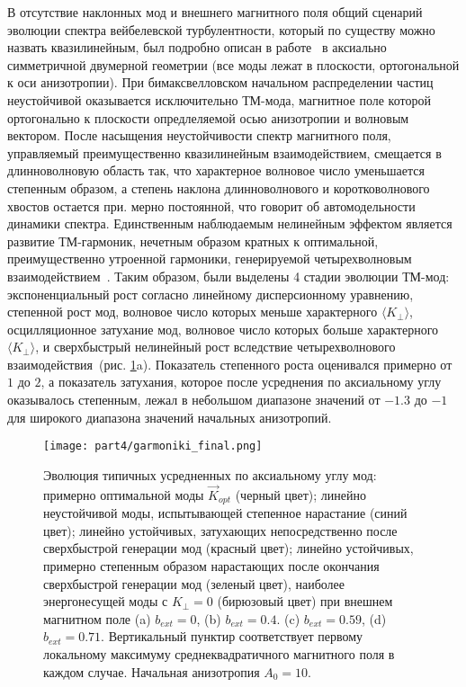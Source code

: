 В отсутствие наклонных мод и внешнего магнитного поля общий сценарий эволюции спектра вейбелевской турбулентности, который по существу можно назвать квазилинейным, был подробно описан в работе~\cite{Kuznetsov2023} в аксиально симметричной двумерной геометрии (все моды лежат в плоскости, ортогональной к оси анизотропии). При бимаксвелловском начальном распределении частиц неустойчивой оказывается исключительно ТМ-мода, магнитное поле которой ортогонально к плоскости опредлеляемой осью анизотропии и волновым вектором. После насыщения неустойчивости спектр магнитного поля, управляемый преимущественно квазилинейным взаимодействием, смещается в длинноволновую область так, что характерное волновое число уменьшается степенным образом, а степень наклона длинноволнового и коротковолнового хвостов остается при.
мерно постоянной, что говорит об автомодельности динамики спектра. Единственным наблюдаемым нелинейным эффектом является развитие ТМ-гармоник, нечетным образом кратных к оптимальной, преимущественно утроенной гармоники, генерируемой четырехволновым взаимодействием~\cite{Garasev2021,Kuznetsov2023}. Таким образом, были выделены 4 стадии эволюции ТМ-мод: экспоненциальный рост согласно линейному дисперсионному уравнению, степенной рост мод, волновое число которых меньше характерного $\langle K_\perp\rangle$, осцилляционное затухание мод, волновое число которых больше характерного $\langle K_\perp\rangle$, и сверхбыстрый нелинейный рост вследствие четырехволнового взаимодействия~(рис. \ref{ris:all_modes}a).  Показатель степенного роста оценивался примерно от $1$ до $2$, а показатель затухания, которое после усреднения по аксиальному углу оказывалось степенным, лежал в небольшом диапазоне значений от $-1.3$ до $-1$ для широкого диапазона значений начальных анизотропий. 

\begin{figure}[h]
\texttt{[image: part4/garmoniki\_final.png]}
\caption{Эволюция типичных усредненных по аксиальному углу мод: примерно оптимальной моды $\overrightarrow{K}_{opt}$ (черный цвет); линейно неустойчивой моды, испытывающей степенное нарастание (синий цвет);  линейно устойчивых, затухающих непосредственно после сверхбыстрой генерации мод (красный цвет); линейно устойчивых, примерно степенным образом нарастающих после окончания сверхбыстрой генерации мод (зеленый цвет), наиболее энергонесущей моды с $K_\perp=0$ (бирюзовый цвет) при внешнем магнитном поле (a) $b_{ext}=0$, (b) $b_{ext}=0.4$. (c) $b_{ext}=0.59$, (d) $b_{ext}=0.71$. Вертикальный пунктир соответствует первому локальному максимуму среднеквадратичного магнитного поля в каждом случае. Начальная анизотропия $A_0=10$.}
\label{ris:all_modes}
\end{figure}

